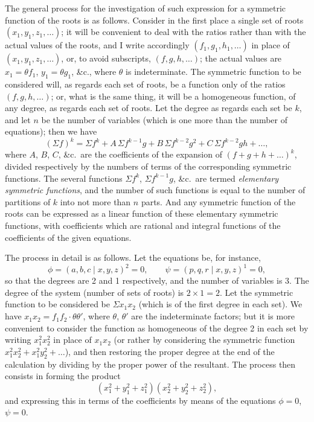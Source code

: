 \documentclass[11pt,a4paper]{book}
\begin{document}
\begin{center}
The general process for the investigation of such expression for a symmetric
function of the roots is as follows. Consider in the first place a single set
of roots $(x_1, y_1, z_1, \ldots)$; it will be convenient to deal with the
ratios rather than with the actual values of the roots, and I write accordingly
$(f_1, g_1, h_1, \ldots)$ in place of $(x_1, y_1, z_1, \ldots)$, or, to
avoid subscripts, $(f, g, h, \ldots)$; the actual values are $x_1 = \theta f_1$,
$y_1 = \theta g_1$, \&c., where $\theta$ is indeterminate. The symmetric function
to be considered will, as regards each set of roots, be a function only of the
ratios $(f, g, h, \ldots)$; or, what is the same thing, it will be a
homogeneous function, of any degree, as regards each set of roots. Let the
degree as regards each set be $k$, and let $n$ be the number of variables
(which is one more than the number of equations); then we have
\[
(\Sigma f)^k = \Sigma f^k + A\, \Sigma f^{k-1}g + B\, \Sigma f^{k-2}g^2
+ C\, \Sigma f^{k-2}gh + \ldots,
\]
where $A$, $B$, $C$, \&c.\ are the coefficients of the expansion of
$(f + g + h + \ldots)^k$, divided respectively by the numbers of terms of the
corresponding symmetric functions. The several functions $\Sigma f^k$,
$\Sigma f^{k-1}g$, \&c.\ are termed \emph{elementary symmetric functions}, and
the number of such functions is equal to the number of partitions of $k$ into
not more than $n$ parts. And any symmetric function of the roots can be
expressed as a linear function of these elementary symmetric functions, with
coefficients which are rational and integral functions of the coefficients of
the given equations.

The process in detail is as follows. Let the equations be, for instance,
\[
\phi = (a, b, c \mid x, y, z)^2 = 0,
\qquad
\psi = (p, q, r \mid x, y, z)^1 = 0,
\]
so that the degrees are 2 and 1 respectively, and the number of variables is
3. The degree of the system (number of sets of roots) is $2 \times 1 = 2$.
Let the symmetric function to be considered be $\Sigma x_1 x_2$ (which is of
the first degree in each set). We have $x_1 x_2 = f_1 f_2 \cdot \theta\theta'$,
where $\theta$, $\theta'$ are the indeterminate factors; but it is more
convenient to consider the function as homogeneous of the degree 2 in each set
by writing $x_1^2 x_2^2$ in place of $x_1 x_2$ (or rather by considering the
symmetric function $x_1^2 x_2^2 + x_1^2 y_2^2 + \ldots$), and then restoring
the proper degree at the end of the calculation by dividing by the proper
power of the resultant. The process then consists in forming the product
\[
(x_1^2 + y_1^2 + z_1^2)(x_2^2 + y_2^2 + z_2^2),
\]
and expressing this in terms of the coefficients by means of the equations
$\phi = 0$, $\psi = 0$.


\end{center}
\end{document}
